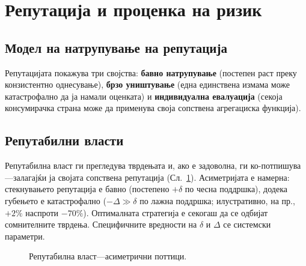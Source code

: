 \documentclass[11pt,a4paper,twocolumn]{article}
\begin{document}
\section{Репутација и проценка на ризик}

\subsection{Модел на натрупување на репутација}

Репутацијата покажува три својства: \textbf{бавно натрупување} (постепен раст преку конзистентно однесување), \textbf{брзо уништување} (една единствена измама може катастрофално да ја намали оценката) и \textbf{индивидуална евалуација} (секоја консумирачка страна може да применува своја сопствена агрегациска функција).

\subsection{Репутабилни власти}

Репутабилна власт ги прегледува тврдењата и, ако е задоволна, ги ко-потпишува---залагајќи ја својата сопствена репутација (Сл.~\ref{fig:authority}). Асиметријата е намерна: стекнувањето репутација е бавно (постепено $+\delta$ по чесна поддршка), додека губењето е катастрофално ($-\Delta \gg \delta$ по лажна поддршка; илустративно, на пр., $+2\%$ наспроти $-70\%$). Оптималната стратегија е секогаш да се одбијат сомнителните тврдења. Специфичните вредности на $\delta$ и $\Delta$ се системски параметри.

\begin{figure}[ht]
\centering
{}
\caption{Репутабилна власт---асиметрични поттици.}
\label{fig:authority}
\end{figure}
\end{document}

